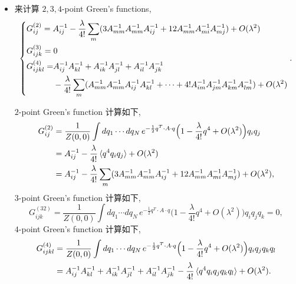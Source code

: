 \begin{itemize}
	\item 来计算 $2, 3, 4$-point Green's functions,
	\begin{equation}
		\begin{dcases}
			G^{(2)}_{i j} = A^{- 1}_{i j} - \frac{\lambda}{4!} \sum_m (3 A^{- 1}_{m m} A^{- 1}_{m m} A^{- 1}_{i j} + 12 A^{- 1}_{m m} A^{- 1}_{m i} A^{- 1}_{m j}) + O(\lambda^2) \\
			G^{(3)}_{i j k} = 0 \\
			\begin{aligned}
				G^{(4)}_{i j k l} =& A^{- 1}_{i j} A^{- 1}_{k l} + A^{- 1}_{i k} A^{- 1}_{j l} + A^{- 1}_{i l} A^{- 1}_{j k} \\
				& - \frac{\lambda}{4!} \sum_m (A^{- 1}_{m m} A^{- 1}_{m m} A^{- 1}_{i j} A^{- 1}_{k l} + \cdots + 4! A^{- 1}_{i m} A^{- 1}_{j m} A^{- 1}_{k m} A^{- 1}_{l m}) + O(\lambda^2)
			\end{aligned}
		\end{dcases}.
	\end{equation}
	
	\begin{tcolorbox}[title=calculation:]
		$2$-point Green's function 计算如下,
		\begin{align}
			G^{(2)}_{i j} &= \frac{1}{Z(0, 0)} \int dq_1 \cdots dq_N \, e^{- \frac{1}{2} q^T \cdot A \cdot q} \Big( 1 - \frac{\lambda}{4!} q^4 + O(\lambda^2) \Big) q_i q_j \notag \\
			&= A^{- 1}_{i j} - \frac{\lambda}{4!} \braket{q^4 q_i q_j} + O(\lambda^2) \notag \\
			&= A^{- 1}_{i j} - \frac{\lambda}{4!} \sum_m (3 A^{- 1}_{m m} A^{- 1}_{m m} A^{- 1}_{i j} + 12 A^{- 1}_{m m} A^{- 1}_{m i} A^{- 1}_{m j}) + O(\lambda^2),
		\end{align}
		$3$-point Green's function 计算如下,
		\begin{equation}
			G^{(32)}_{i j k} = \frac{1}{Z(0, 0)} \int dq_1 \cdots dq_N \, e^{- \frac{1}{2} q^T \cdot A \cdot q} \Big( 1 - \frac{\lambda}{4!} q^4 + O(\lambda^2) \Big) q_i q_j q_k = 0,
		\end{equation}
		$4$-point Green's function 计算如下,
		\begin{align}
			G^{(4)}_{i j k l} &= \frac{1}{Z(0, 0)} \int dq_1 \cdots dq_N \, e^{- \frac{1}{2} q^T \cdot A \cdot q} \Big( 1 - \frac{\lambda}{4!} q^4 + O(\lambda^2) \Big) q_i q_j q_k q_l \notag \\
			&= A^{- 1}_{i j} A^{- 1}_{k l} + A^{- 1}_{i k} A^{- 1}_{j l} + A^{- 1}_{i l} A^{- 1}_{j k} - \frac{\lambda}{4!} \braket{q^4 q_i q_j q_k q_l} + O(\lambda^2).
		\end{align}
	\end{tcolorbox}
\end{itemize}

